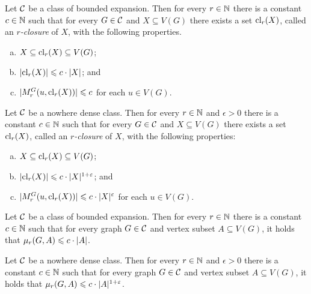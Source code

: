 \begin{lemma}\label{lem:closure-be}
Let $\mathcal{C}$ be a class of bounded expansion. 
Then for every $r\in \mathbb{N}$ there is a constant $c\in \mathbb{N}$ such that for
every $G\in \mathcal{C}$ and $X\subseteq V(G)$ there exists a set $\mathrm{cl}_r(X)$, called an {\em{$r$-closure}} of $X$, with the following properties. 
\begin{enumerate}[(a)]
  \item $X\subseteq \mathrm{cl}_r(X)\subseteq V(G)$;
  \item $|\mathrm{cl}_r(X)|\leqslant c\cdot |X|$; and
  \item $|M_r^G(u,\mathrm{cl}_r(X))|\leqslant c$ for each $u\in V(G)$.
\end{enumerate}
\end{lemma}

\begin{lemma}\label{lem:closure-nd}
Let $\mathcal{C}$ be a nowhere dense class. 
Then for every $r\in\mathbb{N}$ and $\epsilon>0$ there is a 
constant $c\in\mathbb{N}$ such that for every $G\in \mathcal{C}$ and $X\subseteq V(G)$ there exists a set 
$\mathrm{cl}_r(X)$,  called an {\em{$r$-closure}} of $X$, 
with the following properties: 
\begin{enumerate}[(a)]
  \item $X\subseteq \mathrm{cl}_r(X)\subseteq V(G)$;
  \item $|\mathrm{cl}_r(X)|\leqslant c\cdot |X|^{1+\varepsilon}$; and
  \item $|M_r^G(u,\mathrm{cl}_r(X))|\leqslant c\cdot |X|^{\varepsilon}$ for each $u\in V(G)$.
\end{enumerate}
\end{lemma}

\begin{lemma}\label{lem:projection-complexity-be}
Let $\mathcal{C}$ be a class of bounded expansion. Then for every $r\in \mathbb{N}$ there is 
  a constant $c\in\mathbb{N}$ such that for every graph $G\in \mathcal{C}$ and vertex subset $A\subseteq V(G)$, 
  it holds that $\mu_r(G,A)\leqslant c\cdot |A|$.
\end{lemma}

\begin{lemma}\label{lem:projection-complexity-nd}
Let $\mathcal{C}$ be a nowhere dense class. Then for every $r\in \mathbb{N}$ and $\epsilon>0$ there is 
  a constant $c\in \mathbb{N}$ such that for every graph $G\in \mathcal{C}$ and vertex subset $A\subseteq V(G)$, 
  it holds that $\mu_r(G,A)\leqslant c\cdot |A|^{1+\varepsilon}$.
\end{lemma}

